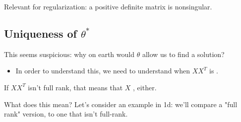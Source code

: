         Relevant for regularization: a positive definite matrix is nonsingular.

    \phantom{}

    \subsection{Uniqueness of $\theta^*$}

        This seems suspicious: why on earth would  $\theta$ allow us to find a solution?

        \begin{itemize}
            \item In order to understand this, we need to understand  when $XX^T$ is .
        \end{itemize}

        \phantom{}

        If $XX^T$ isn't full rank, that means that $X$ , either.


        What does this mean? Let's consider an example in 1d: we'll compare a "full rank" version, to one that isn't full-rank.

